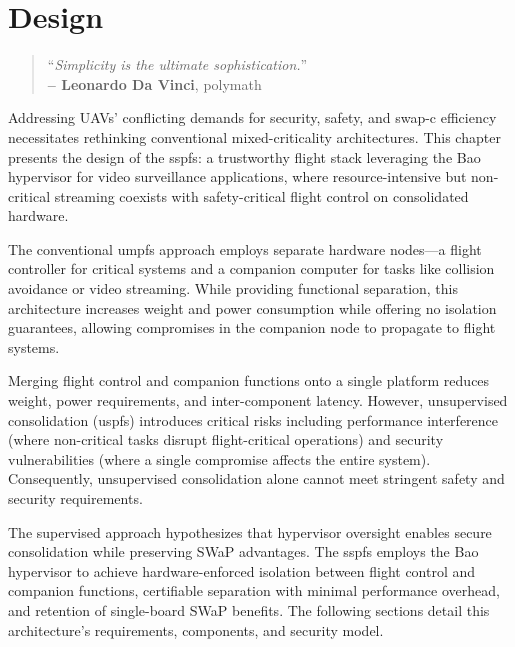 %
\chapter{Design}%
\label{ch:design}
\begin{quote}
\begin{flushright}
``\emph{Simplicity is the ultimate sophistication.}'' \\
\textbf{-- Leonardo Da Vinci}, polymath
\end{flushright}
\end{quote}

Addressing UAVs' conflicting demands for security, safety, and \gls{swap-c} efficiency necessitates rethinking conventional mixed-criticality architectures. This chapter presents the design of the \gls{sspfs}: a trustworthy flight stack leveraging the Bao hypervisor for video surveillance applications, where resource-intensive but non-critical streaming coexists with safety-critical flight control on consolidated hardware.

The conventional \gls{umpfs} approach employs separate hardware nodes—a flight controller for critical systems and a companion computer for tasks like collision avoidance or video streaming. While providing functional separation, this architecture increases weight and power consumption while offering no isolation guarantees, allowing compromises in the companion node to propagate to flight systems.

Merging flight control and companion functions onto a single platform reduces weight, power requirements, and inter-component latency. However, unsupervised consolidation (\gls{uspfs}) introduces critical risks including performance interference (where non-critical tasks disrupt flight-critical operations) and security vulnerabilities (where a single compromise affects the entire system). Consequently, unsupervised consolidation alone cannot meet stringent safety and security requirements.

The supervised approach hypothesizes that hypervisor oversight enables secure consolidation while preserving SWaP advantages. The \gls{sspfs} employs the Bao hypervisor to achieve hardware-enforced isolation between flight control and companion functions, certifiable separation with minimal performance overhead, and retention of single-board SWaP benefits. The following sections detail this architecture's requirements, components, and security model.

